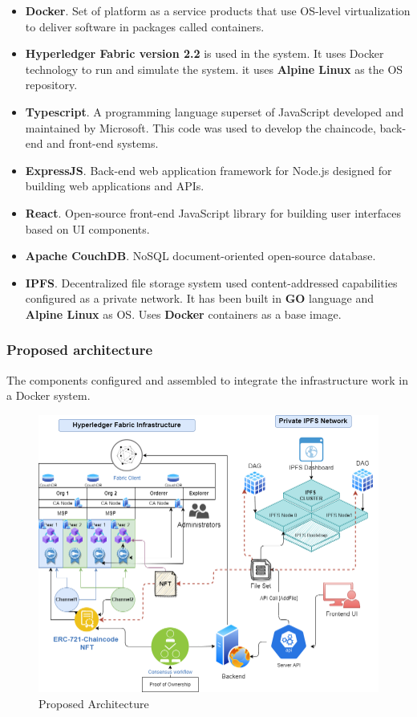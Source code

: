 \begin{itemize}
    \item \textbf{Docker}. Set of platform as a service products that use OS-level virtualization to deliver software in packages called containers.
    \item \textbf{Hyperledger Fabric version 2.2} is used in the system. It uses Docker technology to run and simulate the system. it uses \textbf{Alpine Linux} as the \ac{OS} repository.
    \item \textbf{Typescript}. A programming language superset of JavaScript developed and maintained by Microsoft. This code was used to develop the chaincode, back-end and front-end systems.
    \item \textbf{ExpressJS}. Back-end web application framework for Node.js designed for building web applications and APIs.
    \item \textbf{React}. Open-source front-end JavaScript library for building user interfaces based on UI components.
    \item \textbf{Apache CouchDB}. NoSQL document-oriented open-source database.
    \item \textbf{\ac{IPFS}}. Decentralized file storage system used content-addressed capabilities configured as a private network. It has been built in \textbf{GO} language and  \textbf{Alpine Linux} as \ac{OS}. Uses \textbf{Docker} containers as a base image.
\end{itemize}


\subsubsection{Proposed architecture}
The components configured and assembled to integrate the infrastructure work in a Docker system.

\begin{figure}[!h]
    \centering
    \includegraphics[width=15cm]{img/Hyperledger-NFT-Architecture.png}
    \caption{Proposed Architecture}
    \label{fig:SystemArch}
\end{figure}

